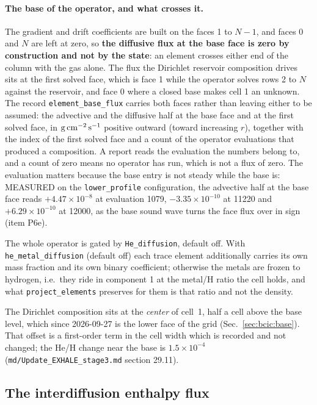 \paragraph{The base of the operator, and what crosses it.}
The gradient and drift coefficients are built on the faces 1 to $N-1$, and
faces 0 and $N$ are left at zero, so \textbf{the diffusive flux at the base
face is zero by construction and not by the state}: an element crosses either
end of the column with the gas alone.  The flux the Dirichlet reservoir
composition drives sits at the first solved face, which is face 1 while the
operator solves rows 2 to $N$ against the reservoir, and face 0 where a
closed base makes cell 1 an unknown.  The record
\texttt{element\_base\_flux} carries both faces rather than leaving either
to be assumed: the advective and the diffusive half at the base face and at
the first solved face, in ${\rm g\,cm^{-2}\,s^{-1}}$ positive outward
(toward increasing $r$), together with the index of the first solved face and
a count of the operator evaluations that produced a composition.  A report
reads the evaluation the numbers belong to, and a count of zero means no
operator has run, which is not a flux of zero.  The evaluation matters
because the base entry is not steady while the base is: MEASURED on the
\texttt{lower\_profile} configuration, the advective half at the base face
reads $+4.47\times10^{-8}$ at evaluation 1079, $-3.35\times10^{-10}$ at
11220 and $+6.29\times10^{-10}$ at 12000, as the base sound wave turns the
face flux over in sign (item P6e).

The whole operator is gated by \texttt{He\_diffusion}, default off. With
\texttt{he\_metal\_diffusion} (default off) each trace element additionally
carries its own mass fraction and its own binary coefficient; otherwise the
metals are frozen to hydrogen, i.e.\ they ride in component 1 at the
metal/H ratio the cell holds, and what \texttt{project\_elements} preserves
for them is that ratio and not the density.

The Dirichlet composition sits at the \emph{center} of cell~1, half a cell
above the base level, which since 2026-09-27 is the lower face of the grid
(Sec.~\ref{sec:bcic:base}).  That offset is a first-order term in the cell
width which is recorded and not changed; the He/H change near the base is
$1.5\times10^{-4}$ (\texttt{md/Update\_EXHALE\_stage3.md} section 29.11).

\subsection{The interdiffusion enthalpy flux}
\label{sec:mol:interdiffusion}

